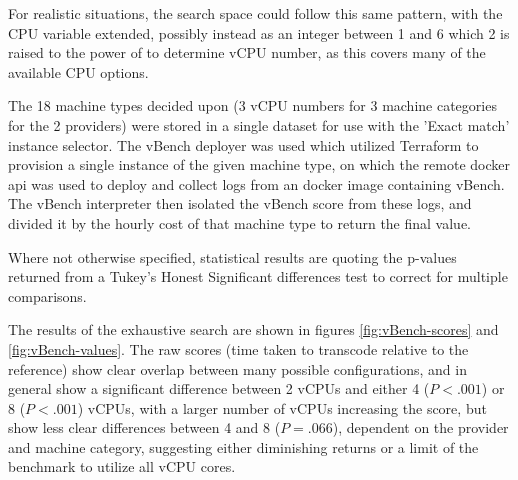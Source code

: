 \documentclass{article}
\begin{document}
For realistic situations, the search space could follow this same pattern, with the CPU variable extended, possibly instead as an integer between 1 and 6 which 2 is raised to the power of to determine vCPU number, as this covers many of the available CPU options.

The 18 machine types decided upon (3 vCPU numbers for 3 machine categories for the 2 providers) were stored in a single dataset for use with the 'Exact match' instance selector. The vBench deployer was used which utilized Terraform to provision a single instance of the given machine type, on which the remote docker api was used to deploy and collect logs from an docker image containing vBench. The vBench interpreter then isolated the vBench score from these logs, and divided it by the hourly cost of that machine type to return the final value.

Where not otherwise specified, statistical results are quoting the p-values returned from a Tukey's Honest Significant differences test to correct for multiple comparisons.

The results of the exhaustive search are shown in figures \ref{fig:vBench-scores} and \ref{fig:vBench-values}. The raw scores (time taken to transcode relative to the reference) show clear overlap between many possible configurations, and in general show a significant difference between 2 vCPUs and either 4 ($P < .001$) or 8 ($P < .001$) vCPUs, with a larger number of vCPUs increasing the score, but show less clear differences between 4 and 8 ($P = .066$), dependent on the provider and machine category, suggesting either diminishing returns or a limit of the benchmark to utilize all vCPU cores.
 
\end{document}
